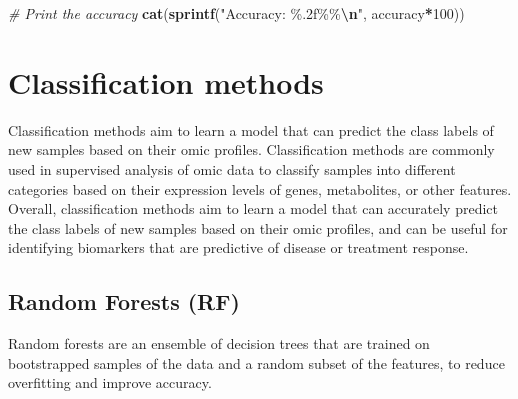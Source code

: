 \documentclass[
]{book}
\newenvironment{Shaded}{\begin{snugshade}}{\end{snugshade}}
\newcommand{\CommentTok}[1]{\textcolor[rgb]{0.56,0.35,0.01}{\textit{#1}}}
\newcommand{\DecValTok}[1]{\textcolor[rgb]{0.00,0.00,0.81}{#1}}
\newcommand{\FunctionTok}[1]{\textcolor[rgb]{0.13,0.29,0.53}{\textbf{#1}}}
\newcommand{\NormalTok}[1]{#1}
\newcommand{\SpecialCharTok}[1]{\textcolor[rgb]{0.81,0.36,0.00}{\textbf{#1}}}
\newcommand{\StringTok}[1]{\textcolor[rgb]{0.31,0.60,0.02}{#1}}
\begin{document}
\begin{Shaded}
\begin{Highlighting}[]
\CommentTok{\# Print the accuracy}
\FunctionTok{cat}\NormalTok{(}\FunctionTok{sprintf}\NormalTok{(}\StringTok{"Accuracy: \%.2f\%\%}\SpecialCharTok{\textbackslash{}n}\StringTok{"}\NormalTok{, accuracy}\SpecialCharTok{*}\DecValTok{100}\NormalTok{))}
\end{Highlighting}
\end{Shaded}

\normalsize

\hypertarget{classification-methods}{%
\section{Classification methods}\label{classification-methods}}

Classification methods aim to learn a model that can predict the class labels of new samples based on their omic profiles. Classification methods are commonly used in supervised analysis of omic data to classify samples into different categories based on their expression levels of genes, metabolites, or other features. Overall, classification methods aim to learn a model that can accurately predict the class labels of new samples based on their omic profiles, and can be useful for identifying biomarkers that are predictive of disease or treatment response.

\hypertarget{random-forests}{%
\subsection{Random Forests (RF)}\label{random-forests}}

Random forests are an ensemble of decision trees that are trained on bootstrapped samples of the data and a random subset of the features, to reduce overfitting and improve accuracy.

\small
\end{document}
